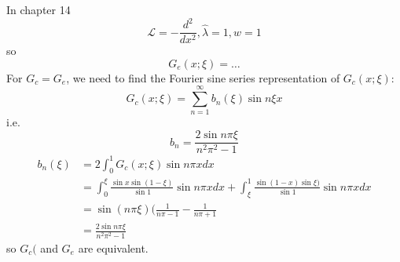 \documentclass[a4paper]{article}
\renewcommand*\L{\mathcal{L}}
\begin{document}
In chapter 14
\[
  \L = - \frac{d^2}{dx^2}, \hat \lambda = 1, w = 1
\]
so
\[
  G_e(x; \xi) = \dots
\]
For \(G_c = G_e\), we need to find the Fourier sine series representation of \(G_c(x; \xi)\):
\[
  G_c(x; \xi) = \sum_{n = 1}^{\infty} b_n(\xi) \sin n\xi x
\]
i.e.
\[
  b_n = \frac{2 \sin n\pi\xi}{n^2\pi^2 - 1}
\]
\begin{align*}
  b_n(\xi) &= 2 \int_{0}^{1} G_c(x; \xi) \sin n\pi x dx \\
           &= \int_{0}^{\xi} \frac{\sin x \sin(1 - \xi)}{\sin 1} \sin n \pi x dx + \int_{\xi}^{1} \frac{\sin (1 - x) \sin \xi)}{\sin 1} \sin n \pi x dx \\
           &= \sin (n\pi\xi) (\frac{1}{n\pi - 1} - \frac{1}{n\pi + 1} \\
           &= \frac{2 \sin n\pi\xi}{n^2\pi^2 - 1}
\end{align*}
so \(G_c(\) and \(G_e\) are equivalent.
\end{document}
